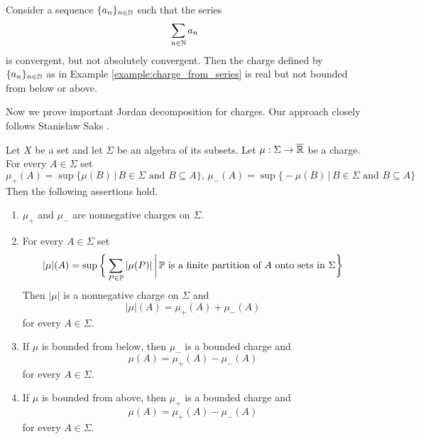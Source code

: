 \begin{example}\label{example:unbounded_charge_from_not_absolutely_convergent_series}
    Consider a sequence $\{a_n\}_{n\in {\mathbb N}}$ such that the series
    $$\sum_{n\in {\mathbb N}}a_n$$
    is convergent, but not absolutely convergent. Then the charge defined by $\{a_n\}_{n\in {\mathbb N}}$ as in Example \ref{example:charge_from_series} is real but not bounded from below or above.
\end{example}
\noindent
Now we prove important Jordan decomposition for charges. Our approach closely follows Stanis{\l}aw Saks \cite{saks1937theory}.

\begin{theorem}\label{theorem:Jordan_decomposition}
    Let $X$ be a set and let $\Sigma$ be an algebra of its subsets. Let $\mu:\Sigma \rightarrow \overline{{\mathbb R}}$ be a charge. For every $A \in \Sigma$ set
    $$\mu_+(A) = \sup\big\{\mu(B)\,\big|\,B\in \Sigma\mbox{ and }B\subseteq A\big\},\,\mu_-(A) = \sup\big\{-\mu(B)\,\big|\,B\in \Sigma\mbox{ and }B\subseteq A\big\}$$
    Then the following assertions hold.
    \begin{enumerate}[label=\emph{\textbf{(\arabic*)}}, leftmargin=*]
        \item $\mu_+$ and $\mu_-$ are nonnegative charges on $\Sigma$.
        \item For every $A \in \Sigma$ set
              $$|\mu|(A) = \sup \bigg\{\sum_{P\in {\mathbb P}}|\mu(P)|\,\bigg|\,{\mathbb P}\mbox{ is a finite partition of }A\mbox{ onto sets in }\Sigma\bigg\}$$
              Then $|\mu|$ is a nonnegative charge on $\Sigma$ and
              $$|\mu|(A) = \mu_+(A) + \mu_-(A)$$
              for every $A \in \Sigma$.
        \item If $\mu$ is bounded from below, then $\mu_-$ is a bounded charge and
              $$\mu(A) = \mu_+(A) - \mu_-(A)$$
              for every $A \in \Sigma$.
        \item If $\mu$ is bounded from above, then $\mu_+$ is a bounded charge and
              $$\mu(A) = \mu_+(A) - \mu_-(A)$$
              for every $A \in \Sigma$.
    \end{enumerate}
\end{theorem}
